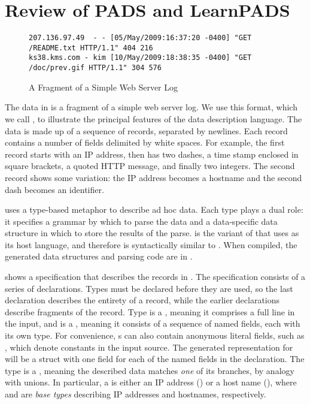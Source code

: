 \section{Review of PADS and LearnPADS}\label{sec:review}
\begin{figure*}
{\footnotesize
\begin{verbatim}
207.136.97.49  - - [05/May/2009:16:37:20 -0400] "GET /README.txt HTTP/1.1" 404 216
ks38.kms.com - kim [10/May/2009:18:38:35 -0400] "GET /doc/prev.gif HTTP/1.1" 304 576
\end{verbatim}
}
\caption{A Fragment of a Simple Web Server Log \ai{}}
\label{fig:ai} 
\end{figure*}

The data in  is a fragment of a simple web server log.
We use this format, which we call
\ai{}, to illustrate the principal features of the \pads{} data
description language. The data 
is made up of a sequence of records, separated by newlines.
Each record contains a number of fields delimited by white spaces. 
For example, the first record starts with an IP address, 
then has two dashes, a time stamp enclosed in
square brackets, a quoted HTTP message, and finally two
integers. The second record shows some variation:
the IP address becomes a hostname and the second dash becomes an identifier.

\pads{} uses a type-based metaphor to
describe ad hoc data.  Each \pads{} type plays a dual role: it
specifies a grammar by which to parse the data and a data-specific
data structure in which to store the results of the parse. 
\padsc{} is the variant of \pads{} that uses \C{} as its host
language, and therefore is syntactically similar to \C{}. 
When compiled, the generated data structures and parsing code 
are in \C{}.

 shows a \padsc{} specification that describes the
records in .  
The specification consists of a
series of declarations. Types must be declared before they are used,
so the last declaration  describes the entirety of a
record, while the earlier declarations describe fragments of the record.  
Type  is a , meaning it comprises a full line in
the input, and is a , meaning it consists of a sequence of
named fields, each with its own type.  For convenience, s
can also contain anonymous literal fields, such as \cd{" ["}, which
denote constants in the input source.  The generated representation
for  will be a \C{} struct with one field for each of the
named fields in the declaration.
The type  is a , meaning the described data
matches \textit{one} of its branches, by analogy with \C{} unions. In
particular, a  is either an IP address () or a
host name (), where  and  are
\padsc{} \textit{base types} describing IP addresses and hostnames,
respectively.  

